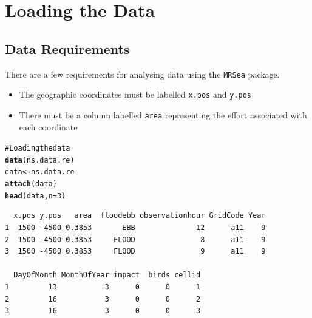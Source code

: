 \documentclass[11pt, a4paper]{article}
\makeatletter
\newcommand{\hlfunctioncall}[1]{\textcolor[rgb]{0.501960784313725,0,0.329411764705882}{\textbf{#1}}}%
\newcommand{\hlstring}[1]{\textcolor[rgb]{0.6,0.6,1}{#1}}%
\newcommand{\hlcomment}[1]{\textcolor[rgb]{0.180392156862745,0.6,0.341176470588235}{#1}}%
\newenvironment{kframe}{%
 \def\at@end@of@kframe{}%
 \ifinner\ifhmode%
  \def\at@end@of@kframe{\end{minipage}}%
  \begin{minipage}{\columnwidth}%
 \fi\fi%
 \def\FrameCommand##1{\hskip\@totalleftmargin \hskip-\fboxsep
 \colorbox{shadecolor}{##1}\hskip-\fboxsep
     \hskip-\linewidth \hskip-\@totalleftmargin \hskip\columnwidth}%
 \MakeFramed {\advance\hsize-\width
   \@totalleftmargin\z@ \linewidth\hsize
   \@setminipage}}%
 {\par\unskip\endMakeFramed%
 \at@end@of@kframe}
\newenvironment{knitrout}{}{} %
\makeatother
\begin{document}
\section{Loading the Data}

\subsection{Data Requirements}
There are a few requirements for analysing data using the {\tt MRSea} package.

\begin{itemize}
\item The geographic coordinates must be labelled {\tt x.pos} and {\tt y.pos}
\item There must be a column labelled {\tt area} representing the effort associated with each coordinate
\end{itemize}

\begin{frame}[fragile]
\begin{knitrout}\footnotesize
{}\color{fgcolor}\begin{kframe}
\begin{alltt}
\hlcomment{# Loading the data}
\hlfunctioncall{data}(\hlstring{ns.data.re})
data <- ns.data.re
\hlfunctioncall{attach}(data)
\hlfunctioncall{head}(data, n=3)
\end{alltt}
\begin{verbatim}
  x.pos y.pos   area  floodebb observationhour GridCode Year
1  1500 -4500 0.3853       EBB              12      a11    9   
2  1500 -4500 0.3853     FLOOD               8      a11    9    
3  1500 -4500 0.3853     FLOOD               9      a11    9   

  DayOfMonth MonthOfYear impact  birds cellid
1         13           3      0      0      1
2         16           3      0      0      2
3         16           3      0      0      3
\end{verbatim}
\end{kframe}
\end{knitrout}

\end{frame}
\end{document}
